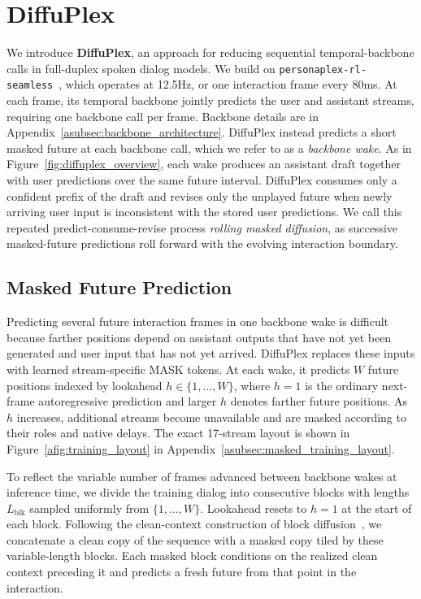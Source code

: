 \section{DiffuPlex}
\label{sec:method}


We introduce \textbf{DiffuPlex}, an approach for reducing sequential temporal-backbone calls in full-duplex spoken dialog models.
We build on \texttt{personaplex-rl-seamless}~\citep{ohashi2026multifacetedinteractivityalignmentfullduplex}, which operates at 12.5Hz, or one interaction frame every 80ms.
At each frame, its temporal backbone jointly predicts the user and assistant streams, requiring one backbone call per frame.
Backbone details are in Appendix~\ref{asubsec:backbone_architecture}.
DiffuPlex instead predicts a short masked future at each backbone call, which we refer to as a \textit{backbone wake}.
As in Figure~\ref{fig:diffuplex_overview}, each wake produces an assistant draft together with user predictions over the same future interval.
DiffuPlex consumes only a confident prefix of the draft and revises only the unplayed future when newly arriving user input is inconsistent with the stored user predictions.
We call this repeated predict-consume-revise process \textit{rolling masked diffusion}, as successive masked-future predictions roll forward with the evolving interaction boundary.

\subsection{Masked Future Prediction}
\label{subsec:masked_future}

Predicting several future interaction frames in one backbone wake is difficult because farther positions depend on assistant outputs that have not yet been generated and user input that has not yet arrived.
DiffuPlex replaces these inputs with learned stream-specific MASK tokens.
At each wake, it predicts $W$ future positions indexed by lookahead $h\in\{1,\ldots,W\}$, where $h=1$ is the ordinary next-frame autoregressive prediction and larger $h$ denotes farther future positions.
As $h$ increases, additional streams become unavailable and are masked according to their roles and native delays.
The exact 17-stream layout is shown in Figure~\ref{afig:training_layout} in Appendix~\ref{asubsec:masked_training_layout}.

To reflect the variable number of frames advanced between backbone wakes at inference time, we divide the training dialog into consecutive blocks with lengths $L_{\mathrm{blk}}$ sampled uniformly from $\{1,\ldots,W\}$.
Lookahead resets to $h=1$ at the start of each block.
Following the clean-context construction of block diffusion~\citep{ICLR2025_7ede97c3}, we concatenate a clean copy of the sequence with a masked copy tiled by these variable-length blocks.
Each masked block conditions on the realized clean context preceding it and predicts a fresh future from that point in the interaction.


